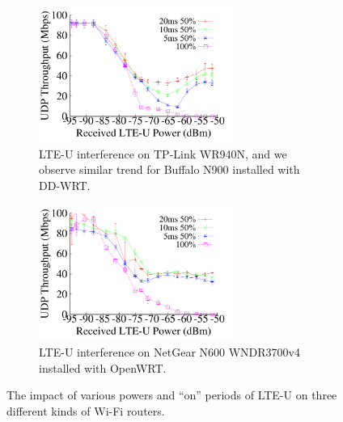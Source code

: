 \begin{figure}[t] \centering 
    \begin{subfigure}[b]{\linewidth} \centering
     \includegraphics[width=2.5in, angle=0]{./figures/impact_power_tplink} 
         \vspace{-0.0cm}
         \caption{LTE-U interference on TP-Link WR940N, and we observe similar trend for Buffalo N900 installed with DD-WRT.}         
        \label{impact_power:a}
    \end{subfigure} %

    \begin{subfigure}[b]{\linewidth}  \centering 
     \includegraphics[width=2.5in, angle=0]{./figures/impact_power_openwrt}  
        \vspace{-0.0cm}
        \caption{LTE-U interference on NetGear N600 WNDR3700v4 installed with OpenWRT.}
        \label{impact_power:b}    
    \end{subfigure} 
\caption{The impact of various powers and ``on'' periods of LTE-U on three different kinds of Wi-Fi routers.}
\label{impact_power}
\vspace{-0.2cm}
\end{figure}


